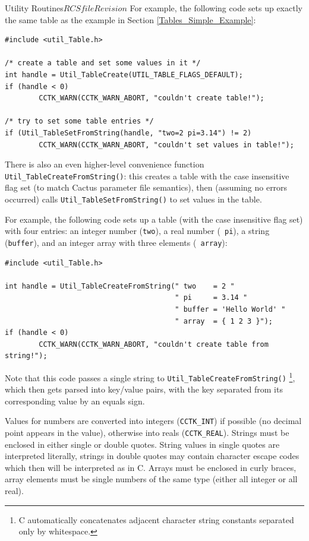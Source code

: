 \begin{cactuspart}{Utility Routines}{$RCSfile$}{$Revision$}
For example, the following code sets up exactly the same table as the
example in Section \ref{Tables_Simple_Example}:

\begin{verbatim}
#include <util_Table.h>

/* create a table and set some values in it */
int handle = Util_TableCreate(UTIL_TABLE_FLAGS_DEFAULT);
if (handle < 0)
        CCTK_WARN(CCTK_WARN_ABORT, "couldn't create table!");

/* try to set some table entries */
if (Util_TableSetFromString(handle, "two=2 pi=3.14") != 2)
        CCTK_WARN(CCTK_WARN_ABORT, "couldn't set values in table!");
\end{verbatim}

There is also an even higher-level convenience function
\verb|Util_TableCreateFromString()|: this creates a table with the
case insensitive flag set (to match Cactus parameter file semantics),
then (assuming no errors occurred) calls \verb|Util_TableSetFromString()|
to set values in the table.

For example, the following code sets up a table (with the case insensitive flag
set) with four entries: an integer number ({\tt two}), a real number ({\tt
pi}), a string ({\tt buffer}), and an integer array with three elements ({\tt
array}):

\begin{verbatim}
#include <util_Table.h>

int handle = Util_TableCreateFromString(" two    = 2 "
                                        " pi     = 3.14 "
                                        " buffer = 'Hello World' "
                                        " array  = { 1 2 3 }");
if (handle < 0)
        CCTK_WARN(CCTK_WARN_ABORT, "couldn't create table from string!");
\end{verbatim}

Note that this code passes a single string to
\verb|Util_TableCreateFromString()|%
\footnote{C automatically concatenates
adjacent character string constants separated only by whitespace.}, 
which then gets parsed into key/value pairs, with the key separated from its
corresponding value by an equals sign.

Values for numbers are converted into integers ({\tt CCTK\_INT}) if possible
(no decimal point appears in the value), otherwise into reals ({\tt CCTK\_REAL}).
Strings must be enclosed in either single or double quotes. String values in
single quotes are interpreted literally, strings in double quotes may contain
character escape codes which then will be interpreted as in C.
Arrays must be enclosed in curly braces, array elements must be single numbers
of the same type (either all integer or all real).


\end{cactuspart}
